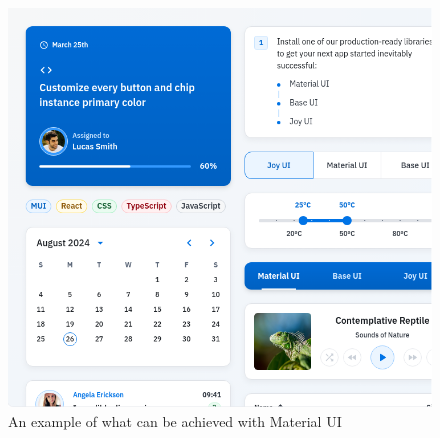 \begin{figure}[!ht]
    \centering
    \includegraphics[width=1\linewidth]{material-ui-example.png}
    \caption{An example of what can be achieved with Material UI \cite{muiPreview}}
    \label{fig:enter-label}
\end{figure}